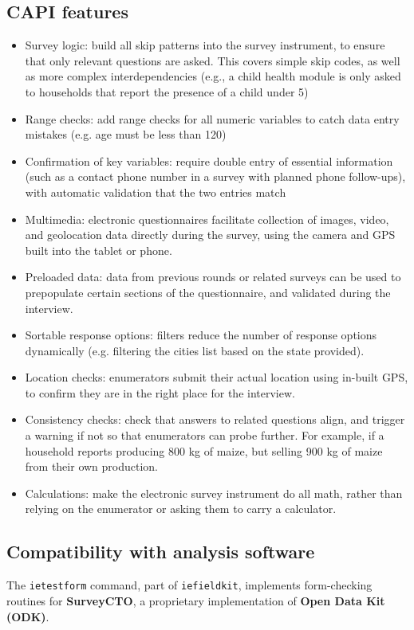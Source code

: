 {\subsection{CAPI features}
\begin{itemize}
	\item{Survey logic}: build all skip patterns into the survey instrument, to ensure that only relevant questions are asked. This covers simple skip codes, as well as more complex interdependencies (e.g., a child health module is only asked to households that report the presence of a child under 5)
	\item{Range checks}:  add range checks for all numeric variables to catch data entry mistakes (e.g. age must be less than 120)
	\item{Confirmation of key variables}: require double entry of essential information (such as a contact phone number in a survey with planned phone follow-ups), with automatic validation that the two entries match
	\item{Multimedia}: electronic questionnaires facilitate collection of images, video, and geolocation data directly during the survey, using the camera and GPS built into the tablet or phone.
	\item{Preloaded data}: data from previous rounds or related surveys can be used to prepopulate certain sections of the questionnaire, and validated during the interview. 
	\item{Sortable response options}: filters reduce the number of response options dynamically (e.g. filtering the cities list based on the state provided). 
	\item{Location checks}: enumerators submit their actual location using in-built GPS, to confirm they are in the right place for the interview. 
	\item{Consistency checks}: check that answers to related questions align, and trigger a warning if not so that enumerators can probe further. For example, if a household reports producing 800 kg of maize, but selling 900 kg of maize from their own production. 
	\item{Calculations}: make the electronic survey instrument do all math, rather than relying on the enumerator or asking them to carry a calculator. 
\end{itemize}

\subsection{Compatibility with analysis software}
The \texttt{ietestform} command, part of
\texttt{iefieldkit}, implements form-checking routines for \textbf{SurveyCTO}, a proprietary implementation of \textbf{Open Data Kit (ODK)}.

}
